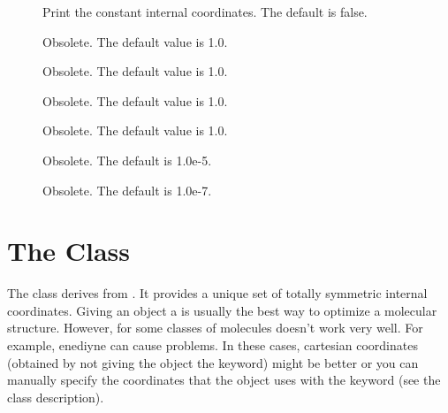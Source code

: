 \begin{description}
  \item[] Print the constant internal
     coordinates.  The default is false.
               
  \item[] Obsolete.  The default value is 1.0.

  \item[] Obsolete.  The default value is 1.0.
               
  \item[] Obsolete.  The default value is 1.0.

  \item[] Obsolete.  The default value is 1.0.

  \item[] Obsolete.  The default is 1.0e-5.

  \item[] Obsolete.  The default is 1.0e-7.

\end{description}



\section{The  Class}\label{SymmMolecularCoor}

The  class derives from
.  It provides a unique set of totally symmetric
internal coordinates.  Giving an  object a
 is usually the best way to optimize a molecular structure.
However, for some classes of molecules  doesn't
work very well.  For example, enediyne can cause problems.  In these cases,
cartesian coordinates (obtained by not giving the
 object the  keyword) might be better
or you can manually specify the coordinates that the
 object uses with the  keyword
(see the  class description).

